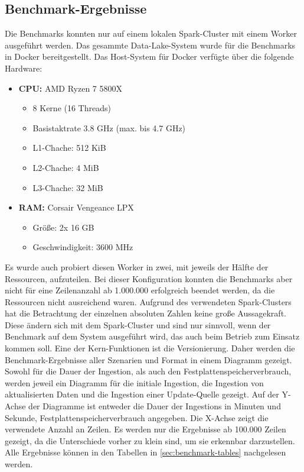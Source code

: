 \pagebreak
\subsection{Benchmark-Ergebnisse}

Die Benchmarks konnten nur auf einem lokalen Spark-Cluster mit einem Worker ausgeführt werden.
Das gesammte Data-Lake-System wurde für die Benchmarks in Docker bereitgestellt.
Das Host-System für Docker verfügte über die folgende Hardware:
\begin{itemize}
    \item \textbf{CPU:} AMD Ryzen 7 5800X
          \begin{itemize}
              \item 8 Kerne (16 Threads)
              \item Basistaktrate 3.8 GHz (max. bis 4.7 GHz)
              \item L1-Chache: 512 KiB
              \item L2-Chache: 4 MiB
              \item L3-Chache: 32 MiB
          \end{itemize}
    \item \textbf{RAM:} Corsair Vengeance LPX
          \begin{itemize}
              \item Größe: 2x 16 GB
              \item Geschwindigkeit: 3600 MHz
          \end{itemize}
\end{itemize}

Es wurde auch probiert diesen Worker in zwei, mit jeweils der Hälfte der Ressourcen, aufzuteilen.
Bei dieser Konfiguration konnten die Benchmarks aber nicht für eine Zeilenanzahl ab 1.000.000 erfolgreich beendet werden, da die Ressourcen nicht ausreichend waren.
Aufgrund des verwendeten Spark-Clusters hat die Betrachtung der einzelnen absoluten Zahlen keine große Aussagekraft.
Diese ändern sich mit dem Spark-Cluster und sind nur sinnvoll, wenn der Benchmark auf dem System ausgeführt wird, das auch beim Betrieb zum Einsatz kommen soll.
Eine der Kern-Funktionen ist die Versionierung.
Daher werden die Benchmark-Ergebnisse aller Szenarien und Format in einem Diagramm gezeigt.
Sowohl für die Dauer der Ingestion, als auch den Festplattenspeicherverbrauch, werden jeweil ein Diagramm für die initiale Ingestion, die Ingestion von aktualisierten Daten und die Ingestion einer Update-Quelle gezeigt.
Auf der Y-Achse der Diagramme ist entweder die Dauer der Ingestions in Minuten und Sekunde, Festplattenspeicherverbrauch angegeben.
Die X-Achse zeigt die verwendete Anzahl an Zeilen.
Es werden nur die Ergebnisse ab 100.000 Zeilen gezeigt, da die Unterschiede vorher zu klein sind, um sie erkennbar darzustellen.
Alle Ergebnisse können in den Tabellen in \cref{sec:benchmark-tables} nachgelesen werden.

